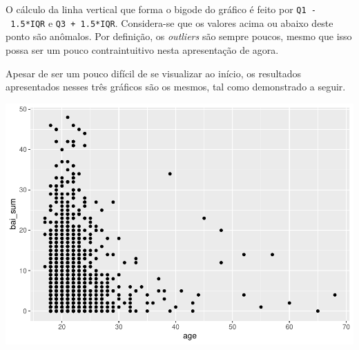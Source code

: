 \documentclass[
]{book}
\newenvironment{Shaded}{\begin{snugshade}}{\end{snugshade}}
\newcommand{\CommentTok}[1]{\textcolor[rgb]{0.56,0.35,0.01}{\textit{#1}}}
\newcommand{\DataTypeTok}[1]{\textcolor[rgb]{0.13,0.29,0.53}{#1}}
\newcommand{\DecValTok}[1]{\textcolor[rgb]{0.00,0.00,0.81}{#1}}
\newcommand{\FloatTok}[1]{\textcolor[rgb]{0.00,0.00,0.81}{#1}}
\newcommand{\KeywordTok}[1]{\textcolor[rgb]{0.13,0.29,0.53}{\textbf{#1}}}
\newcommand{\NormalTok}[1]{#1}
\newcommand{\OperatorTok}[1]{\textcolor[rgb]{0.81,0.36,0.00}{\textbf{#1}}}
\newcommand{\StringTok}[1]{\textcolor[rgb]{0.31,0.60,0.02}{#1}}
\begin{document}
O cálculo da linha vertical que forma o bigode do gráfico é feito por \texttt{Q1\ -\ 1.5*IQR} e \texttt{Q3\ +\ 1.5*IQR}. Considera-se que os valores acima ou abaixo deste ponto são anômalos. Por definição, os \emph{outliers} são sempre poucos, mesmo que isso possa ser um pouco contraintuitivo nesta apresentação de agora.

Apesar de ser um pouco difícil de se visualizar ao início, os resultados apresentados nesses três gráficos são os mesmos, tal como demonstrado a seguir.

\begin{Shaded}
\end{Shaded}

\begin{center}\includegraphics{gitbook-demo_files/figure-latex/unnamed-chunk-22-1} \end{center}
\end{document}
